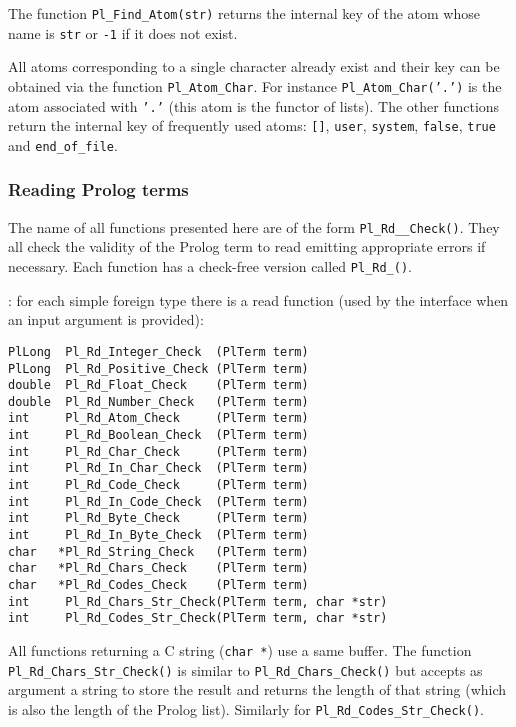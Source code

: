 The function \texttt{Pl\_Find\_Atom(str)} returns the internal key of the
atom whose name is \texttt{str} or \texttt{-1} if it does not exist.

All atoms corresponding to a single character already exist and their
key can be obtained via the function \texttt{Pl\_Atom\_Char}.  For
instance \texttt{Pl\_Atom\_Char('.')} is the atom associated with
\texttt{'.'} (this atom is the functor of lists). The other functions return
the internal key of frequently used atoms: \texttt{[]}, \texttt{user}, \texttt{system},
\texttt{false}, \texttt{true} and \texttt{end\_of\_file}.

\subsubsection{Reading Prolog terms}
\label{Reading-Prolog-terms}
The name of all functions presented here are of the form
\texttt{Pl\_Rd\_\_Check()}. They all check the validity of the
Prolog term to read emitting appropriate errors if necessary. Each function
has a check-free version called \texttt{Pl\_Rd\_()}.

: for each simple foreign type
 there is a read function (used by the
interface when an input argument is provided):

\begin{Indentation}
\begin{verbatim}
PlLong  Pl_Rd_Integer_Check  (PlTerm term)
PlLong  Pl_Rd_Positive_Check (PlTerm term)
double  Pl_Rd_Float_Check    (PlTerm term)
double  Pl_Rd_Number_Check   (PlTerm term)
int     Pl_Rd_Atom_Check     (PlTerm term)
int     Pl_Rd_Boolean_Check  (PlTerm term)
int     Pl_Rd_Char_Check     (PlTerm term)
int     Pl_Rd_In_Char_Check  (PlTerm term)
int     Pl_Rd_Code_Check     (PlTerm term)
int     Pl_Rd_In_Code_Check  (PlTerm term)
int     Pl_Rd_Byte_Check     (PlTerm term)
int     Pl_Rd_In_Byte_Check  (PlTerm term)
char   *Pl_Rd_String_Check   (PlTerm term)
char   *Pl_Rd_Chars_Check    (PlTerm term)
char   *Pl_Rd_Codes_Check    (PlTerm term)
int     Pl_Rd_Chars_Str_Check(PlTerm term, char *str)
int     Pl_Rd_Codes_Str_Check(PlTerm term, char *str)
\end{verbatim}
\end{Indentation}

All functions returning a C string (\texttt{char *}) use a same buffer. The
function \texttt{Pl\_Rd\_Chars\_Str\_Check()} is similar to
\texttt{Pl\_Rd\_Chars\_Check()} but accepts as argument a string to store the
result and returns the length of that string (which is also the length of
the Prolog list). Similarly for \texttt{Pl\_Rd\_Codes\_Str\_Check()}.

